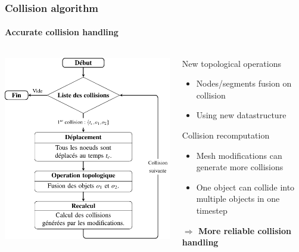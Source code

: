 \documentclass[aspectratio=1610,t,10pt]{beamer}
\newlength{\freeheight}
\begin{document}
\begin{frame}
\frametitle{Collision algorithm}
\framesubtitle{Accurate collision handling}
\begin{columns}[c]
	\begin{column}{.48\textwidth}
		\includegraphics[height=\freeheight]{img/algo-collision}
	\end{column}
	\begin{column}{.48\textwidth}
		\begin{block}{New topological operations}
			\begin{itemize}
				\item Nodes/segments fusion on collision
				\item Using new datastructure
			\end{itemize}
		\end{block}
		\begin{block}{Collision recomputation}
			\begin{itemize}
				\item Mesh modifications can generate more collisions
				\item One object can collide into multiple objects in one timestep
			\end{itemize}
		\end{block}
		\textbf{$\Rightarrow$ More reliable collision handling}
		
	\end{column}
\end{columns}
\end{frame}
\end{document}
